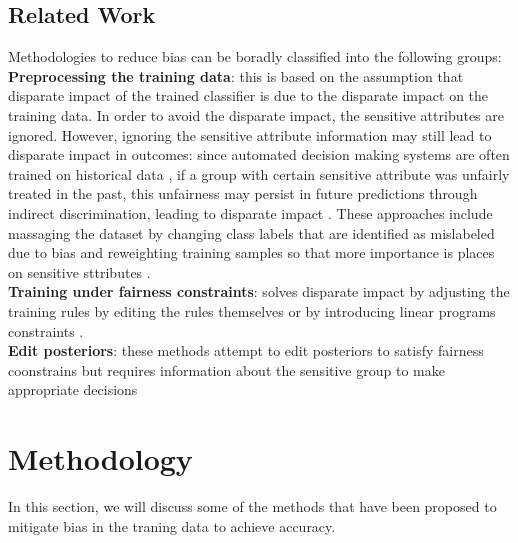 \documentclass[runningheads]{llncs}
\begin{document}
\subsection{Related Work}
Methodologies to reduce bias can be boradly classified into the following groups:\\
\textbf{Preprocessing the training data}: this is based on the assumption that disparate impact of the trained classifier is due to the disparate impact on the training data. In order to avoid the disparate impact, the sensitive attributes are ignored. However, ignoring the sensitive attribute information may still lead to disparate impact in outcomes: since automated decision making systems are often trained on historical data , if a group with certain sensitive attribute was unfairly treated in the past, this unfairness may persist in future predictions through indirect discrimination, leading to disparate impact \cite{zafar2015fairness}. These approaches include massaging the dataset \cite{calders2009building} \cite{kamiran2009classifying} \cite{kamiran2012data} \cite{vzliobaite2011handling} by changing class labels that are identified as mislabeled due to bias and reweighting training samples so that more importance is places on sensitive sttributes \cite{calders2009building} \cite{kamiran2012data}.\\
\textbf{Training under fairness constraints}: solves disparate impact by adjusting the training rules by editing the rules themselves \cite{calders2013controlling} \cite{zafar2015fairness} or by introducing linear programs constraints \cite{celis2017ranking} \cite{dwork2012fairness} \cite{romei2014multidisciplinary} \cite{zafar2015fairness}. \\
\textbf{Edit posteriors}: these methods attempt to edit posteriors to satisfy fairness coonstrains but requires information about the sensitive group to make appropriate decisions \cite{dionne2014economic} \cite{doherty2012information} \cite{feldman2015computational} \cite{hardt2016equality}
\section{Methodology}
In this section, we will discuss some of the methods that have been proposed to mitigate bias in the traning data to achieve accuracy.
\end{document}
